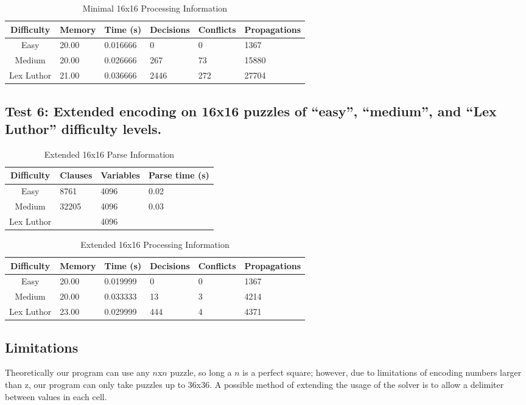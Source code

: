 \documentclass[conference,draftclsnofoot]{IEEEtran}
\begin{document}
\begin{table}[!h]
	\centering
	\begin{tabular}{c | l l p{20pt} p{20pt}  l }
		Difficulty & Memory & Time (s) & Decisions &
		Conflicts & Propagations \\\hline
		Easy 		& 20.00 & 0.016666 & 0  & 0  & 1367\\
		Medium 		& 20.00 & 0.026666 & 267 & 73 & 15880\\
		Lex Luthor 	& 21.00 & 0.036666 & 2446 & 272 & 27704
	\end{tabular}
	\caption{Minimal 16x16 Processing Information}
	\label{tab:summary} 
\end{table}

\subsection{Test 6: Extended encoding	on 16x16 puzzles of ``easy'',
``medium'', and ``Lex Luthor'' difficulty levels.}

\begin{table}[!h]
	\centering
	\begin{tabular}{c | l l l}
		Difficulty & Clauses & Variables & Parse time (s) \\\hline
		Easy	& 8761 & 4096 & 0.02\\
		Medium 	& 32205 & 4096 & 0.03\\
		Lex Luthor & & 4096 & \\
	\end{tabular}
	\caption{Extended 16x16 Parse Information}
	\label{tab:summary}
\end{table}

\begin{table}[!h]
	\centering
	\begin{tabular}{c | l l p{20pt} p{20pt}  l }
		Difficulty & Memory & Time (s) & Decisions &
		Conflicts & Propagations \\\hline
		Easy 		& 20.00 & 0.019999 & 0 & 0 & 1367\\
		Medium 		& 20.00 & 0.033333 & 13 & 3 & 4214\\
		Lex Luthor 	& 23.00 & 0.029999 & 444 & 4 & 4371
	\end{tabular}
	\caption{Extended 16x16 Processing Information}
	\label{tab:summary}
\end{table}

\subsection{Limitations}
Theoretically our program can use any $n$x$n$ puzzle, so long a $n$ is a
perfect square; however, due to limitations of encoding numbers larger than z,
our program can only take puzzles up to 36x36. A possible method of extending
the usage of the solver is to allow a delimiter between values in each cell.
\end{document}
